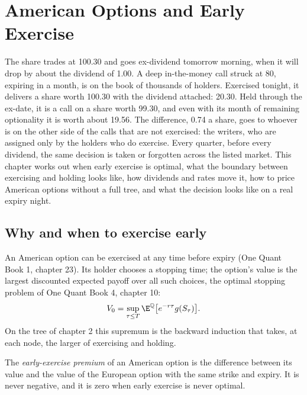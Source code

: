 \chapter{American Options and Early Exercise}\label{ch:dv:american-options-and-early-exercise}

The share trades at 100.30 and goes ex-dividend tomorrow morning, when it
will drop by about the dividend of 1.00. A deep in-the-money call struck at
80, expiring in a month, is on the book of thousands of holders. Exercised
tonight, it delivers a share worth 100.30 with the dividend attached: 20.30.
Held through the ex-date, it is a call on a share worth 99.30, and even with
its month of remaining optionality it is worth about 19.56. The difference, 0.74
a share, goes to whoever is on the other side of the calls that are not
exercised: the writers, who are assigned only by the holders who do exercise.
Every quarter, before every dividend, the same decision is taken or forgotten
across the listed market. This chapter works out when early exercise is optimal,
what the boundary between exercising and holding looks like, how dividends and
rates move it, how to price American options without a full tree, and what the
decision looks like on a real expiry night.

\section{Why and when to exercise early}

An American option can be exercised at any time before expiry (One Quant Book 1,
chapter 23). Its holder chooses a stopping time; the option's value is the
largest discounted expected payoff over all such choices, the optimal stopping
problem of One Quant Book 4, chapter 10:
\[
V_0=\sup_{\tau\le T}\E^{\mathbb Q}\bigl[e^{-r\tau}g(S_\tau)\bigr].
\]
On the tree of chapter 2 this supremum is the backward induction that takes, at
each node, the larger of exercising and holding.

\begin{definition}\label{def:dv:american-options-and-early-exercise:premium}
The \emph{early-exercise premium} of an American option
is the difference between its value and the value of the European option with the
same strike and expiry. It is never negative, and it is zero when early exercise is
never optimal.
\end{definition}

